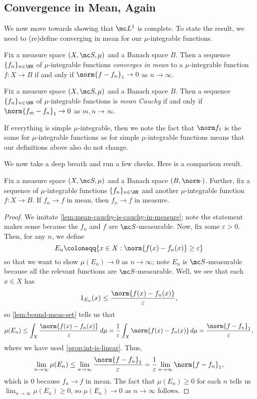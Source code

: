 \documentclass[../notes.tex]{subfiles}
\begin{document}
\subsection{Convergence in Mean, Again}
We now move towards showing that $\mc L^1$ is complete. To state the result, we need to (re)define converging in mean for our $\mu$-integrable functions.
\begin{definition}
	Fix a measure space $(X,\mc S,\mu)$ and a Banach space $B$. Then a sequence $\{f_n\}_{n\in\NN}$ of $\mu$-integrable functions \textit{converges in mean} to a $\mu$-integrable function $f\colon X\to B$ if and only if $\norm{f-f_n}_1\to0$ as $n\to\infty$.
\end{definition}
\begin{definition}
	Fix a measure space $(X,\mc S,\mu)$ and a Banach space $B$. Then a sequence $\{f_n\}_{n\in\NN}$ of $\mu$-integrable functions is \textit{mean Cauchy} if and only if $\norm{f_m-f_n}_1\to0$ as $m,n\to\infty$.
\end{definition}
\begin{remark}
	If everything is simple $\mu$-integrable, then we note the fact that $\norm f_1$ is the same for $\mu$-integrable functions as for simple $\mu$-integrable functions means that our definitions above also do not change.
\end{remark}
We now take a deep breath and run a few checks. Here is a comparison result.
\begin{lemma} \label{lem:converge-in-mean-to-converge-in-measure}
	Fix a measure space $(X,\mc S,\mu)$ and a Banach space $(B,\norm\cdot)$. Further, fix a sequence of $\mu$-integrable functions $\{f_n\}_{n\in\NN}$ and another $\mu$-integrable function $f\colon X\to B$. If $f_n\to f$ in mean, then $f_n\to f$ in measure.
\end{lemma}
\begin{proof}
	We imitate \autoref{lem:mean-cauchy-is-cauchy-in-measure}; note the statement makes sense because the $f_n$ and $f$ are $\mc S$-measurable. Now, fix some $\varepsilon>0$. Then, for any $n$, we define
	\[E_{n}\coloneqq\{x\in X:\norm{f(x)-f_n(x)}\ge\varepsilon\}\]
	so that we want to show $\mu(E_n)\to0$ as $n\to\infty$; note $E_n$ is $\mc S$-measurable because all the relevant functions are $\mc S$-measurable. Well, we see that each $x\in X$ has
	\[1_{E_{n}}(x)\le\frac{\norm{f(x)-f_n(x)}}\varepsilon,\]
	so \autoref{lem:bound-meas-set} tells us that
	\[\mu(E_n)\le\int_X\frac{\norm{f(x)-f_n(x)}}\varepsilon\,d\mu=\frac1\varepsilon\int_X\norm{f(x)-f_n(x)}\,d\mu=\frac{\norm{f-f_n}_1}\varepsilon,\]
	where we have used \autoref{prop:int-is-linear}. Thus,
	\[\lim_{n\to\infty}\mu(E_n)\le\lim_{n\to\infty}\frac{\norm{f-f_n}_1}\varepsilon=\frac1\varepsilon\lim_{n\to\infty}\norm{f-f_n}_1,\]
	which is $0$ because $f_n\to f$ in mean. The fact that $\mu(E_n)\ge0$ for each $n$ tells us $\lim_{n\to\infty}\mu(E_n)\ge0$, so $\mu(E_n)\to0$ as $n\to\infty$ follows.
\end{proof}
\end{document}

